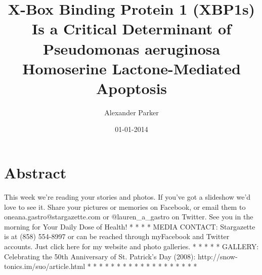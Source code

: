 \documentclass{article}%
\title{X{-}Box Binding Protein 1 (XBP1s) Is a Critical Determinant of Pseudomonas aeruginosa Homoserine Lactone{-}Mediated Apoptosis}%
\author{Alexander Parker}%
\affil{Department of Pathology, Yale University School of Medicine, New Haven, CT 06520, USA.}%
\date{01{-}01{-}2014}%
\begin{document}
%
\normalsize%
\maketitle%
\section{Abstract}%
\label{sec:Abstract}%
This week we're reading your stories and photos. If you've got a slideshow we'd love to see it. Share your pictures or memories on Facebook, or email them to oneana.gastro@stargazette.com or @lauren\_a\_gastro on Twitter.\newline%
See you in the morning for Your Daily Dose of Health!\newline%
*\newline%
*\newline%
*\newline%
*\newline%
MEDIA CONTACT: Stargazette is at (858) 554{-}8997 or can be reached through myFacebook and Twitter accounts. Just click here for my website and photo galleries.\newline%
*\newline%
*\newline%
*\newline%
*\newline%
*\newline%
GALLERY:\newline%
Celebrating the 50th Anniversary of St. Patrick's Day (2008): http://snow{-}tonics.im/suo/article.html\newline%
*\newline%
*\newline%
*\newline%
*\newline%
*\newline%
*\newline%
*\newline%
*\newline%
*\newline%
*\newline%
*\newline%
*\newline%
*\newline%
*\newline%
*\newline%
*\newline%
*\newline%
*\newline%
*\newline%
\end{document}
